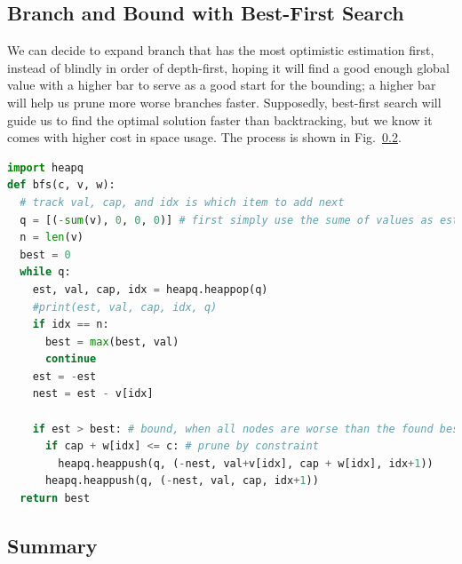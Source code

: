 \documentclass[../main.tex]{subfiles}
\begin{document}
\subsection{Branch and Bound with Best-First Search}
We can decide to expand branch that has the most optimistic estimation first, instead of blindly in order of depth-first,  hoping it will find a good enough global value with a higher bar to serve as a good start for the bounding; a higher bar will help us prune more worse branches faster. Supposedly, best-first search will guide us to find the optimal solution faster than backtracking, but we know it comes with higher cost in space usage. The process is shown in Fig.~\ref{}.
\begin{lstlisting}[language=Python]
import heapq
def bfs(c, v, w):
  # track val, cap, and idx is which item to add next
  q = [(-sum(v), 0, 0, 0)] # first simply use the sume of values as estimation
  n = len(v)
  best = 0
  while q:
    est, val, cap, idx = heapq.heappop(q)
    #print(est, val, cap, idx, q)
    if idx == n:
      best = max(best, val)
      continue
    est = -est
    nest = est - v[idx]

    if est > best: # bound, when all nodes are worse than the found best, prune
      if cap + w[idx] <= c: # prune by constraint
        heapq.heappush(q, (-nest, val+v[idx], cap + w[idx], idx+1))
      heapq.heappush(q, (-nest, val, cap, idx+1))
  return best
\end{lstlisting}


\subsection{Summary}
\end{document}
